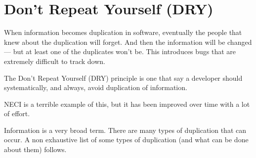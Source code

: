 \documentclass[a4paper,notitlepage]{scrreprt}
\begin{document}
\section{Don't Repeat Yourself (DRY)}
	When information becomes duplication in software, eventually the people
	that knew about the duplication will forget. And then the information will
	be changed --- but at least one of the duplicates won't be. This introduces
	bugs that are extremely difficult to track down.

	The Don't Repeat Yourself (DRY) principle is one that say a developer
	should systematically, and always, avoid duplication of information.

	NECI is a terrible example of this, but it has been improved over time
	with a lot of effort.

	Information is a very broad term. There are many types of duplication that
	can occur. A non exhaustive list of some types of duplication (and what
	can be done about them) follows.
\end{document}
